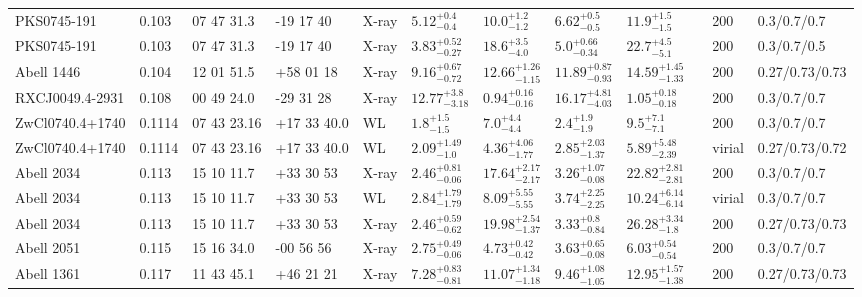 \begin{landscape}
\begin{center}
{\begin{longtable}{llllllllllll}
PKS0745-191 & 0.103 & 07 47 31.3 & -19 17 40 & X-ray & ${5.12}^{+0.4}_{-0.4}$ & ${10.0}^{+1.2}_{-1.2}$ & ${6.62}^{+0.5}_{-0.5}$ & ${11.9}^{+1.5}_{-1.5}$ & \citet{PO05.1} & 200 & 0.3/0.7/0.7 \\
PKS0745-191 & 0.103 & 07 47 31.3 & -19 17 40 & X-ray & ${3.83}^{+0.52}_{-0.27}$ & ${18.6}^{+3.5}_{-4.0}$ & ${5.0}^{+0.66}_{-0.34}$ & ${22.7}^{+4.5}_{-5.1}$ & \citet{AL03.1} & 200 & 0.3/0.7/0.5 \\
Abell 1446 & 0.104 & 12 01 51.5 & +58 01 18 & X-ray & ${9.16}^{+0.67}_{-0.72}$ & ${12.66}^{+1.26}_{-1.15}$ & ${11.89}^{+0.87}_{-0.93}$ & ${14.59}^{+1.45}_{-1.33}$ & \citet{BA14.1} & 200 & 0.27/0.73/0.73 \\
RXCJ0049.4-2931 & 0.108 & 00 49 24.0 & -29 31 28 & X-ray & ${12.77}^{+3.8}_{-3.18}$ & ${0.94}^{+0.16}_{-0.16}$ & ${16.17}^{+4.81}_{-4.03}$ & ${1.05}^{+0.18}_{-0.18}$ & \citet{ET11.1} & 200 & 0.3/0.7/0.7 \\
ZwCl0740.4+1740 & 0.1114 & 07 43 23.16 & +17 33 40.0 & WL & ${1.8}^{+1.5}_{-1.5}$ & ${7.0}^{+4.4}_{-4.4}$ & ${2.4}^{+1.9}_{-1.9}$ & ${9.5}^{+7.1}_{-7.1}$ & \citet{SE14.1} & 200 & 0.3/0.7/0.7 \\
ZwCl0740.4+1740 & 0.1114 & 07 43 23.16 & +17 33 40.0 & WL & ${2.09}^{+1.49}_{-1.0}$ & ${4.36}^{+4.06}_{-1.77}$ & ${2.85}^{+2.03}_{-1.37}$ & ${5.89}^{+5.48}_{-2.39}$ & \citet{OK10.1} & virial & 0.27/0.73/0.72 \\
Abell 2034 & 0.113 & 15 10 11.7 & +33 30 53 & X-ray & ${2.46}^{+0.81}_{-0.06}$ & ${17.64}^{+2.17}_{-2.17}$ & ${3.26}^{+1.07}_{-0.08}$ & ${22.82}^{+2.81}_{-2.81}$ & \citet{ET11.1} & 200 & 0.3/0.7/0.7 \\
Abell 2034 & 0.113 & 15 10 11.7 & +33 30 53 & WL & ${2.84}^{+1.79}_{-1.79}$ & ${8.09}^{+5.55}_{-5.55}$ & ${3.74}^{+2.25}_{-2.25}$ & ${10.24}^{+6.14}_{-6.14}$ & \citet{OK08.1} & virial & 0.3/0.7/0.7 \\
Abell 2034 & 0.113 & 15 10 11.7 & +33 30 53 & X-ray & ${2.46}^{+0.59}_{-0.62}$ & ${19.98}^{+2.54}_{-1.37}$ & ${3.33}^{+0.8}_{-0.84}$ & ${26.28}^{+3.34}_{-1.8}$ & \citet{BA14.1} & 200 & 0.27/0.73/0.73 \\
Abell 2051 & 0.115 & 15 16 34.0 & -00 56 56 & X-ray & ${2.75}^{+0.49}_{-0.06}$ & ${4.73}^{+0.42}_{-0.42}$ & ${3.63}^{+0.65}_{-0.08}$ & ${6.03}^{+0.54}_{-0.54}$ & \citet{ET11.1} & 200 & 0.3/0.7/0.7 \\
Abell 1361 & 0.117 & 11 43 45.1 & +46 21 21 & X-ray & ${7.28}^{+0.83}_{-0.81}$ & ${11.07}^{+1.34}_{-1.18}$ & ${9.46}^{+1.08}_{-1.05}$ & ${12.95}^{+1.57}_{-1.38}$ & \citet{BA14.1} & 200 & 0.27/0.73/0.73 \\

\end{longtable}}
\end{center}
\end{landscape}
